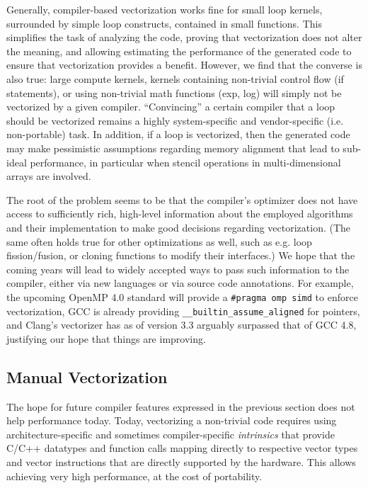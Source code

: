 \documentclass[conference]{IEEEtran}
\begin{document}
Generally, compiler-based vectorization works fine for small loop
kernels, surrounded by simple loop constructs, contained in small
functions. This simplifies the task of analyzing the code, proving
that vectorization does not alter the meaning, and allowing estimating
the performance of the generated code to ensure that vectorization
provides a benefit. However, we find that the converse is also true:
large compute kernels, kernels containing non-trivial control flow
(if statements), or using non-trivial math functions (exp, log) will
simply not be vectorized by a given compiler. ``Convincing'' a certain
compiler that a loop should be vectorized remains a highly
system-specific and vendor-specific (i.e. non-portable) task. In
addition, if a loop is vectorized, then the generated code may make
pessimistic assumptions regarding memory alignment that lead to
sub-ideal performance, in particular when stencil operations in
multi-dimensional arrays are involved.

The root of the problem seems to be that the compiler's optimizer
does not have access to sufficiently rich, high-level
information about the employed algorithms and their implementation to
make good decisions regarding vectorization. (The same often holds true for
other optimizations as well, such as e.g. loop fission/fusion, or
cloning functions to modify their interfaces.) We hope that the coming
years will lead to widely accepted ways to pass such information to
the compiler, either via new languages or via source code annotations.
For example, the upcoming OpenMP 4.0 standard will provide a
\verb+#pragma omp simd+ to enforce vectorization, GCC is already
providing \verb+__builtin_assume_aligned+ for pointers, and Clang's
vectorizer has as of version 3.3 arguably surpassed that of GCC 4.8,
justifying our hope that things are improving.

\subsection{Manual Vectorization}

The hope for future compiler features expressed in the previous
section does not help performance today. Today, vectorizing a
non-trivial code requires using architecture-specific and sometimes
compiler-specific \emph{intrinsics} that provide C/C++ datatypes and
function calls mapping directly to respective vector types and vector
instructions that
are directly supported by the hardware.
This allows
achieving very high performance, at the cost of portability.
\end{document}
